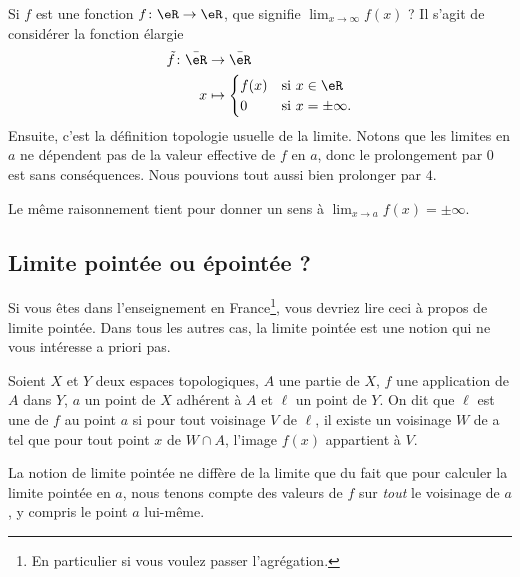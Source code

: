 Si \( f\) est une fonction \( f\colon \eR\to \eR\), que signifie \( \lim_{x\to \infty} f(x)\) ? Il s'agit de considérer la fonction élargie
\begin{equation}
    \begin{aligned}
        \tilde f\colon \bar \eR&\to \bar\eR \\
        x&\mapsto \begin{cases}
            f(x)    &   \text{si } x\in \eR\\
            0    &    \text{si } x=\pm\infty.
        \end{cases}
    \end{aligned}
\end{equation}
Ensuite, c'est la définition topologie usuelle de la limite. Notons que les limites en \( a\) ne dépendent pas de la valeur effective de \( f\) en \( a\), donc le prolongement par \( 0\) est sans conséquences. Nous pouvions tout aussi bien prolonger par \( 4\).

Le même raisonnement tient pour donner un sens à \( \lim_{x\to a} f(x)=\pm \infty\).

\subsection{Limite pointée ou épointée ?}
\label{SUBSECooVHKCooYRFgrb}

Si vous êtes dans l'enseignement en France\footnote{En particulier si vous voulez passer l'agrégation.}, vous devriez lire ceci à propos de limite pointée. Dans tous les autres cas, la limite pointée est une notion qui ne vous intéresse a priori pas.

\begin{definition}
    Soient $X$ et $Y$ deux espaces topologiques, $A$ une partie de $X$, $f$ une application de $A$ dans $Y$, $a$ un point de $X$ adhérent à $A$ et \(\ell \) un point de $Y$. On dit que \( \ell\) est une  de $f$ au point $a$ si pour tout voisinage $V$ de \( \ell\), il existe un voisinage $W$ de a tel que pour tout point $x$ de $W\cap A$, l'image $f(x)$ appartient à $V$.
\end{definition}

La notion de limite pointée ne diffère de la limite que du fait que pour calculer la limite pointée en \( a\), nous tenons compte des valeurs de \( f\) sur \emph{tout} le voisinage de \( a\), y compris le point \( a\) lui-même.

